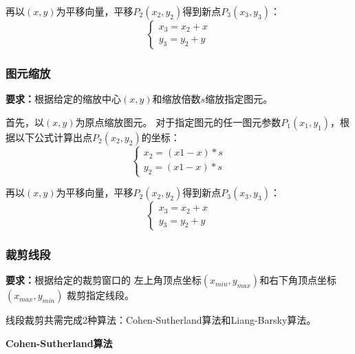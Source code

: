 \documentclass[a4paper,UTF8]{article}
\begin{document}
再以$(x,y)$为平移向量，平移$P_2(x_2,y_2)$得到新点$P_3(x_3,y_3)$：
\begin{equation*}
    \begin{cases}
        x_3=x_2+x\\
        y_3=y_2+y
    \end{cases}
\end{equation*}


\subsubsection{图元缩放}
\textbf{要求：}根据给定的缩放中心$(x,y)$和缩放倍数$s$缩放指定图元。

首先，以$(x,y)$为原点缩放图元。
对于指定图元的任一图元参数$P_1(x_1,y_1)$，根据以下公式计算出点$P_2(x_2,y_2)$的坐标：
\begin{equation*}
    \begin{cases}
        x_2=(x1-x)*s\\
        y_2=(x1-x)*s
    \end{cases}
\end{equation*}

再以$(x,y)$为平移向量，平移$P_2(x_2,y_2)$得到新点$P_3(x_3,y_3)$：
\begin{equation*}
    \begin{cases}
        x_3=x_2+x\\
        y_3=y_2+y
    \end{cases}
\end{equation*}


\subsubsection{裁剪线段}
\textbf{要求：}根据给定的裁剪窗口的
左上角顶点坐标$(x_{min},y_{max})$和右下角顶点坐标$(x_{max},y_{min})$
裁剪指定线段。

线段裁剪共需完成2种算法：Cohen-Sutherland算法和Liang-Barsky算法。

\textbf{Cohen-Sutherland算法}
\end{document}
